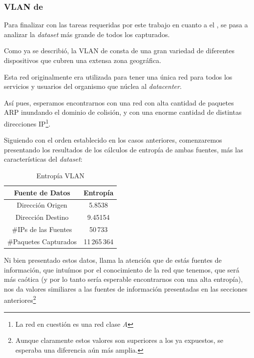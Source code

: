 \subsubsection{VLAN de~}
\par Para finalizar con las tareas requeridas por este trabajo en cuanto
a el , se pasa a analizar la \textit{dataset} m\'as
grande de todos los capturados.

\par Como ya se describi\'o, la VLAN de  consta de una
gran variedad de diferentes dispositivos que cubren una extensa zona geogr\'afica.

\par Esta red originalmente era utilizada para tener una \'unica red para
todos los servicios y usuarios del organismo que n\'uclea al \textit{datacenter}.

\par As\'i pues, esperamos encontrarnos con una red con alta cantidad de 
paquetes ARP inundando el dominio de colisi\'on, y con una enorme cantidad
de distintas direcciones IP\footnote{La red en cuesti\'on es una red
clase \textit{A}}.

\par Siguiendo con el orden establecido en los casos anteriores, comenzaremos
presentando los resultados de los c\'alculos de entrop\'ia de ambas fuentes,
m\'as las caracter\'isticas del \textit{dataset}:

\begin{table}[!h]
\centering
  \begin{tabular}{c c}
    Fuente de Datos & Entrop\'ia \\
    \hline\hline
    Direcci\'on Origen & 5.8538 \\
    Direcci\'on Destino &  9.45154 \\
    \hline\hline
    \#IPs de las Fuentes & 50\,733 \\
    \#Paquetes Capturados & 11\,265\,364 \\
    \hline
    \end{tabular}
  \bigskip
  \caption{Entrop\'ia VLAN }
  \label{tab:vlan1_entropia}
\end{table}

\par Ni bien presentado estos datos, llama la atenci\'on que de est\'as fuentes
de informaci\'on, que intu\'imos por el conocimiento de la red que tenemos, que
ser\'a m\'as ca\'otica (y por lo tanto ser\'ia esperable encontrarnos con una
alta entrop\'ia), nos da valores similiares a las fuentes de informaci\'on
presentadas en las secciones anteriores\footnote{Aunque claramente estos valores
son superiores a los ya expuestos, se esperaba una diferencia a\'un m\'as amplia.}



